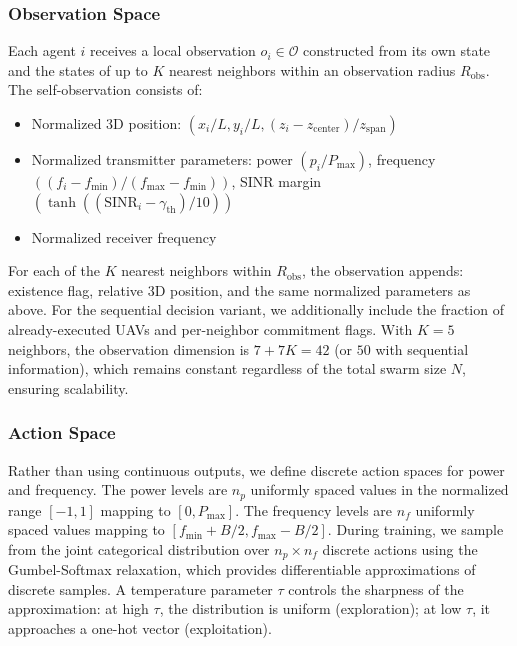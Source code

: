 \documentclass[conference]{IEEEtran}
\begin{document}
\subsubsection{Observation Space}
Each agent $i$ receives a local observation $o_i \in \mathcal{O}$ constructed from its own state and the states of up to $K$ nearest neighbors within an observation radius $R_{\text{obs}}$. The self-observation consists of:
\begin{itemize}
    \item Normalized 3D position: $(x_i/L, y_i/L, (z_i - z_{\text{center}})/z_{\text{span}})$
    \item Normalized transmitter parameters: power $(p_i/P_{\max})$, frequency $((f_i - f_{\min})/(f_{\max} - f_{\min}))$, SINR margin $(\tanh((\text{SINR}_i - \gamma_{\text{th}})/10))$
    \item Normalized receiver frequency
\end{itemize}
For each of the $K$ nearest neighbors within $R_{\text{obs}}$, the observation appends: existence flag, relative 3D position, and the same normalized parameters as above. For the sequential decision variant, we additionally include the fraction of already-executed UAVs and per-neighbor commitment flags. With $K = 5$ neighbors, the observation dimension is $7 + 7K = 42$ (or $50$ with sequential information), which remains constant regardless of the total swarm size $N$, ensuring scalability.

\subsubsection{Action Space}
Rather than using continuous outputs, we define discrete action spaces for power and frequency. The power levels are $n_p$ uniformly spaced values in the normalized range $[-1, 1]$ mapping to $[0, P_{\max}]$. The frequency levels are $n_f$ uniformly spaced values mapping to $[f_{\min}+B/2, f_{\max}-B/2]$. During training, we sample from the joint categorical distribution over $n_p \times n_f$ discrete actions using the Gumbel-Softmax relaxation, which provides differentiable approximations of discrete samples. A temperature parameter $\tau$ controls the sharpness of the approximation: at high $\tau$, the distribution is uniform (exploration); at low $\tau$, it approaches a one-hot vector (exploitation).
\end{document}
